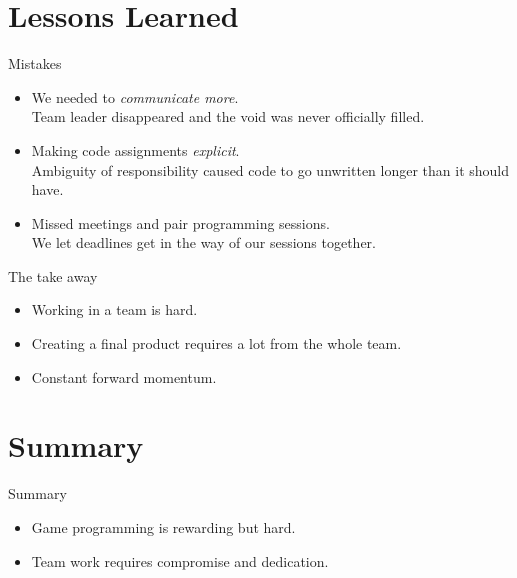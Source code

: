 \documentclass[]{beamer}
\begin{document}
\section{Lessons Learned}
\begin{frame}{Mistakes}
  \begin{itemize}
  \item We needed to \emph{communicate more}. \\
    Team leader disappeared and the void was never officially filled.
  \item Making code assignments \emph{explicit}. \\
    Ambiguity of responsibility caused code to go unwritten longer
    than it should have.
  \item Missed meetings and pair programming sessions. \\
    We let deadlines get in the way of our sessions together.
  \end{itemize}
\end{frame}

\begin{frame}{The take away}
  \begin{itemize}
  \item Working in a team is hard.
  \item Creating a final product requires a lot from the whole team.
  \item Constant forward momentum.
  \end{itemize}
\end{frame}



\section*{Summary}
\begin{frame}{Summary}
  \begin{itemize}
  \item Game programming is rewarding but hard.
  \item Team work requires compromise and dedication.
  \end{itemize}
\end{frame}
\end{document}
